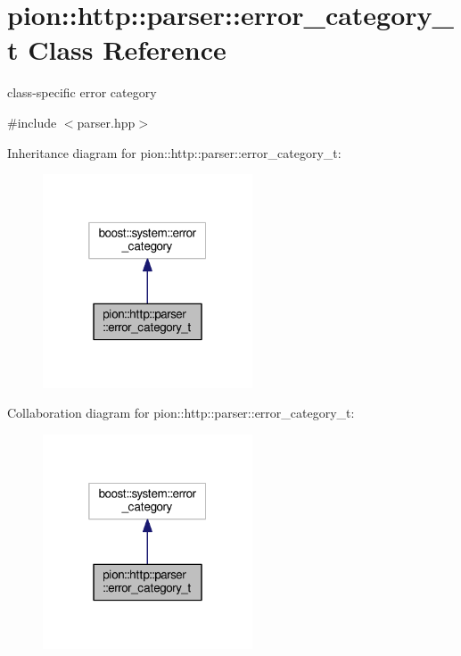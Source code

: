 \hypertarget{classpion_1_1http_1_1parser_1_1error__category__t}{\section{pion\-:\-:http\-:\-:parser\-:\-:error\-\_\-category\-\_\-t Class Reference}
\label{classpion_1_1http_1_1parser_1_1error__category__t}
}


class-\/specific error category  




{\ttfamily \#include $<$parser.\-hpp$>$}



Inheritance diagram for pion\-:\-:http\-:\-:parser\-:\-:error\-\_\-category\-\_\-t\-:
\nopagebreak
\begin{figure}[H]
\begin{center}
\leavevmode
\includegraphics[width=176pt]{classpion_1_1http_1_1parser_1_1error__category__t__inherit__graph}
\end{center}
\end{figure}


Collaboration diagram for pion\-:\-:http\-:\-:parser\-:\-:error\-\_\-category\-\_\-t\-:
\nopagebreak
\begin{figure}[H]
\begin{center}
\leavevmode
\includegraphics[width=176pt]{classpion_1_1http_1_1parser_1_1error__category__t__coll__graph}
\end{center}
\end{figure}
